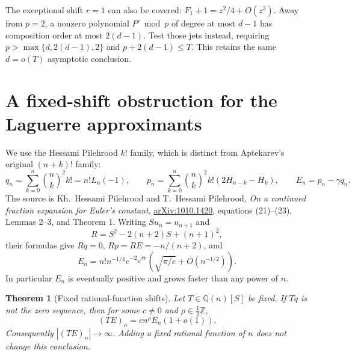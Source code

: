 \documentclass[11pt,a4paper]{article}
\newtheorem{theorem}{Theorem}[section]
\theoremstyle{definition}
\theoremstyle{remark}
\theoremstyle{plain}
\numberwithin{equation}{section}
\begin{document}
The exceptional shift \(r=1\) can also be covered:
\(F_1+1=z^2/4+O(z^3)\). Away from \(p=2\), a nonzero polynomial
\(P'\bmod p\) of degree at most \(d-1\) has composition order at most
\(2(d-1)\). Test those jets instead, requiring \(p>\max\{d,2(d-1),2\}\)
and \(p+2(d-1)\le T\). This retains the same \(d=o(T)\) asymptotic
conclusion.

\section{A fixed-shift obstruction for the Laguerre approximants}
\label{sc:hp:sec:laguerre-shift-obstruction}

We use the Hessami Pilehrood $k!$ family, which is distinct from
Aptekarev's original $(n+k)!$ family:
\[
 q_n=\sum_{k=0}^n\binom nk^2k!=n!L_n(-1),\qquad
 p_n=\sum_{k=0}^n\binom nk^2k!(2H_{n-k}-H_k),\qquad
 E_n=p_n-\gamma q_n.
\]
The source is Kh.~Hessami Pilehrood and T.~Hessami Pilehrood,
\emph{On a continued fraction expansion for Euler's constant},
\href{https://arxiv.org/pdf/1010.1420}{arXiv:1010.1420},
equations (21)--(23), Lemmas 2--3, and Theorem 1.
Writing $S u_n=u_{n+1}$ and
\[
 R=S^2-2(n+2)S+(n+1)^2,
\]
their formulas give $Rq=0$, $Rp=RE=-n/(n+2)$, and
\begin{equation}\label{sc:hp:eq:hp-error-growth}
 E_n=n!n^{-1/4}e^{-2\sqrt n}
       \left(\sqrt{\pi/e}+O(n^{-1/2})\right).
\end{equation}
In particular $E_n$ is eventually positive and grows faster than any
power of $n$.

\begin{theorem}[Fixed rational-function shifts]
\label{sc:hp:thm:fixed-hp-shifts}
Let $T\in\mathbb Q(n)[S]$ be fixed.  If $Tq$ is not the zero
sequence, then for some $c\ne0$ and $\rho\in\frac12\mathbb Z$,
\[
 (TE)_n=c n^\rho E_n(1+o(1)).
\]
Consequently $|(TE)_n|\to\infty$.  Adding a fixed rational function
of $n$ does not change this conclusion.
\end{theorem}
\end{document}
